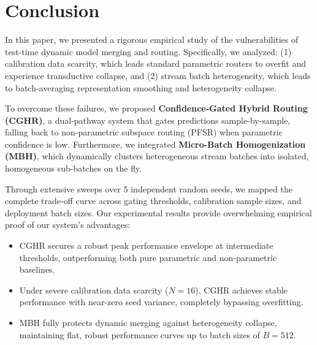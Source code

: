 \section{Conclusion}
\label{sec:conclusion}

In this paper, we presented a rigorous empirical study of the vulnerabilities of test-time dynamic model merging and routing. Specifically, we analyzed: (1) calibration data scarcity, which leads standard parametric routers to overfit and experience transductive collapse, and (2) stream batch heterogeneity, which leads to batch-averaging representation smoothing and heterogeneity collapse. 

To overcome these failures, we proposed \textbf{Confidence-Gated Hybrid Routing (CGHR)}, a dual-pathway system that gates predictions sample-by-sample, falling back to non-parametric subspace routing (PFSR) when parametric confidence is low. Furthermore, we integrated \textbf{Micro-Batch Homogenization (MBH)}, which dynamically clusters heterogeneous stream batches into isolated, homogeneous sub-batches on the fly.

Through extensive sweeps over 5 independent random seeds, we mapped the complete trade-off curve across gating thresholds, calibration sample sizes, and deployment batch sizes. Our experimental results provide overwhelming empirical proof of our system's advantages:
\begin{itemize}
    \item CGHR secures a robust peak performance envelope at intermediate thresholds, outperforming both pure parametric and non-parametric baselines.
    \item Under severe calibration data scarcity ($N=16$), CGHR achieves stable performance with near-zero seed variance, completely bypassing overfitting.
    \item MBH fully protects dynamic merging against heterogeneity collapse, maintaining flat, robust performance curves up to batch sizes of $B=512$.
\end{itemize}

